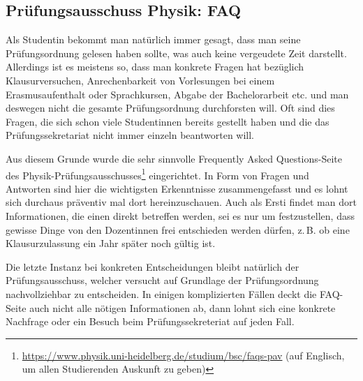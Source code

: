 \vspace{-2mm}
\subsection{Prüfungsausschuss Physik: FAQ}
\vspace{-1mm}
Als Studentin bekommt man natürlich immer gesagt, dass man seine Prüfungsordnung gelesen haben sollte, was auch keine vergeudete Zeit darstellt. Allerdings ist es meistens so, dass man konkrete Fragen hat bezüglich Klausurversuchen, Anrechenbarkeit von Vorlesungen bei einem Erasmusaufenthalt oder Sprachkursen, Abgabe der Bachelorarbeit etc. und man deswegen nicht die gesamte Prüfungsordnung durchforsten will. Oft sind dies Fragen, die sich schon viele Studentinnen bereits gestellt haben und die das Prüfungssekretariat nicht immer einzeln beantworten will. 

Aus diesem Grunde wurde die sehr sinnvolle Frequently Asked Questions-Seite des Physik-Prüfungsausschusses\footnote{\url{https://www.physik.uni-heidelberg.de/studium/bsc/faqs-pav} (auf Englisch, um allen Studierenden Auskunft zu geben)} eingerichtet. In Form von Fragen und Antworten sind hier die wichtigsten Erkenntnisse zusammengefasst und es lohnt sich durchaus präventiv mal dort hereinzuschauen. Auch als Ersti findet man dort Informationen, die einen direkt betreffen werden, sei es nur um festzustellen, dass gewisse Dinge von den Dozentinnen frei entschieden werden dürfen, z.\,B. ob eine Klausurzulassung ein Jahr später noch gültig ist.

Die letzte Instanz bei konkreten Entscheidungen bleibt natürlich der Prüfungsausschuss, welcher versucht auf Grundlage der Prüfungsordnung nachvollziehbar zu entscheiden. In einigen komplizierten Fällen deckt die FAQ-Seite auch nicht alle nötigen Informationen ab, dann lohnt sich eine konkrete Nachfrage oder ein Besuch beim Prüfungssekreteriat auf jeden Fall.
